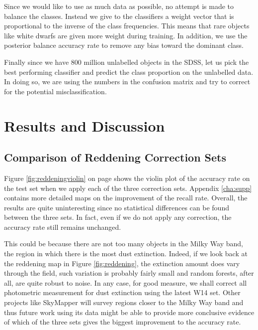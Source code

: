 Since we would like to use as much data as possible, no attempt is made to balance the classes.
Instead we give to the classifiers a weight vector that is proportional to the inverse
of the class frequencies. This means that rare objects like white dwarfs are given more
weight during training. In addition, we use the posterior balance accuracy rate to remove
any bias toward the dominant class.

Finally since we have 800 million unlabelled objects in the SDSS, let us pick the
best performing classifier and predict the class proportion on the unlabelled data.
In doing so, we are using the numbers in the confusion matrix and try to correct for the
potential misclassification.

\section{Results and Discussion}
\label{sec:results1}

\subsection{Comparison of Reddening Correction Sets}
\label{sub:extinction}

Figure \ref{fig:reddeningviolin} on page \pageref{fig:reddeningviolin} shows
the violin plot of the accuracy rate on the test
set when we apply each of the three correction sets. Appendix \ref{cha:supp} contains
more detailed maps on the improvement of the recall rate. Overall, the results are quite
uninteresting since no statistical differences can be found between the three sets. In fact,
even if we do not apply any correction, the accuracy rate still remains unchanged.

This could be because there are not too many objects in the Milky Way band,
the region in which there is the most dust extinction. Indeed, if we look back at the reddening map
in Figure \ref{fig:reddening}, the extinction amount does vary through the field, such 
variation is probably fairly small and random forests, after all, are quite robust to noise.
In any case, for good measure, we shall correct all photometric measurement for dust
extinction using
the latest W14 set. Other projects like SkyMapper will survey regions closer to the Milky
Way band and thus future work using its data might be able to provide more conclusive
evidence of which of the three sets gives the biggest improvement to the accuracy rate.

